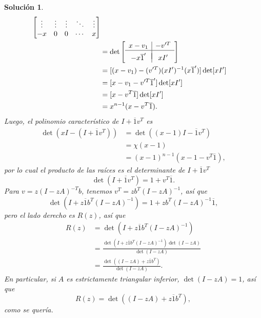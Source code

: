 \documentclass[11pt]{article}
\newtheorem*{sol}{Solución}
\newcommand\ol\overline
\begin{document}
\begin{sol}
\begin{align}
\begin{bmatrix}
      \vdots & \vdots & \vdots & \ddots & \vdots \\
      -x & 0 & 0 & \cdots & x \\
    \end{bmatrix}
    \\
    &= \det
    \left[
      \begin{array}{c|c}
        x-v_1 & -v'^T \\
        \hline \\[-3mm]
        -x\ol 1' & xI'
      \end{array}
  \right]
    \\
    &= [(x-v_1)-(v'^T)(xI')^{-1}(x\ol 1')]\det[xI'] \\
    &= [x-v_1-v'^T\ol 1']\det[xI'] \\
    &= [x-v^{T}\ol 1]\det[xI'] \\
    &= x^{n-1}(x-v^{T}\ol 1)
  .\end{align}
  Luego, el polinomio característico de $I+\ol 1 v^{T}$ es
  \begin{align}
    \det(xI-(I+\ol 1v^{T}))
    &= \det((x-1)I-\ol 1v^{T}) \\
    &= \chi(x-1) \\
    &= (x-1)^{n-1}(x-1-v^{T}\ol 1)
  ,\end{align}
  por lo cual el producto de las raíces es el determinante de $I+\ol
  1v^{T}$
  \begin{equation}
    \det(I+\ol 1v^{T}) = 1+v^{T}\ol 1
  .\end{equation}
  Para $v=z(I-zA)^{-T}b$, tenemos $v^{T}=zb^{T}(I-zA)^{-1}$, así que
  \begin{equation}
    \det(I+z\ol 1b^{T}(I-zA)^{-1}) = 1+zb^{T}(I-zA)^{-1}\ol 1
  ,\end{equation}
  pero el lado derecho es $R(z)$, así que
  \begin{align}
    R(z)
    &= \det(I+z\ol 1b^{T}(I-zA)^{-1}) \\
    &= \frac{ \det(I+z\ol 1b^{T}(I-zA)^{-1})\det(I-zA)}{\det(I-zA)} \\
    &= \frac{ \det((I-zA)+z\ol 1b^{T})}{\det(I-zA)}
  .\end{align}
  En particular, si $A$ es estrictamente triangular inferior,
  $\det(I-zA)=1$, así que
  \begin{equation}
    R(z) = \det((I-zA)+z\ol 1b^{T})
  ,\end{equation}
  como se quería.
\end{sol}
\end{document}
